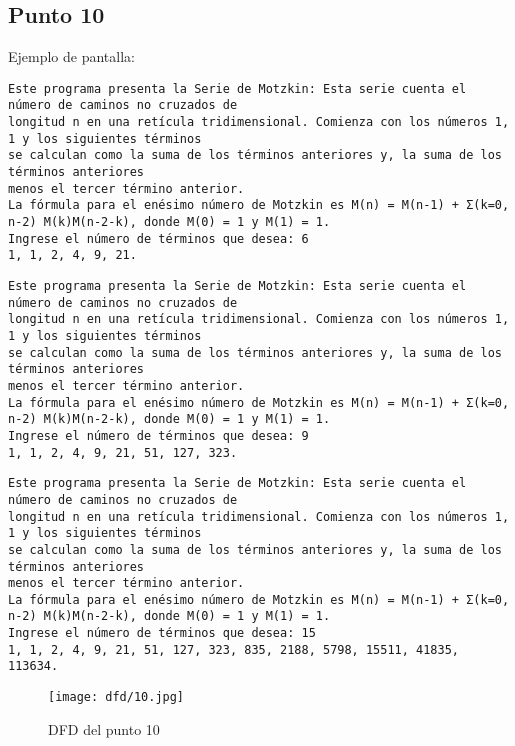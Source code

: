 


\subsection{Punto 10}
	
	Ejemplo de pantalla:
\begin{lstlisting}
Este programa presenta la Serie de Motzkin: Esta serie cuenta el número de caminos no cruzados de 
longitud n en una retícula tridimensional. Comienza con los números 1, 1 y los siguientes términos 
se calculan como la suma de los términos anteriores y, la suma de los términos anteriores 
menos el tercer término anterior. 
La fórmula para el enésimo número de Motzkin es M(n) = M(n-1) + Σ(k=0, n-2) M(k)M(n-2-k), donde M(0) = 1 y M(1) = 1.
Ingrese el número de términos que desea: 6
1, 1, 2, 4, 9, 21.
\end{lstlisting}

\begin{lstlisting}
Este programa presenta la Serie de Motzkin: Esta serie cuenta el número de caminos no cruzados de 
longitud n en una retícula tridimensional. Comienza con los números 1, 1 y los siguientes términos 
se calculan como la suma de los términos anteriores y, la suma de los términos anteriores 
menos el tercer término anterior. 
La fórmula para el enésimo número de Motzkin es M(n) = M(n-1) + Σ(k=0, n-2) M(k)M(n-2-k), donde M(0) = 1 y M(1) = 1.
Ingrese el número de términos que desea: 9
1, 1, 2, 4, 9, 21, 51, 127, 323.
\end{lstlisting}

\begin{lstlisting}
Este programa presenta la Serie de Motzkin: Esta serie cuenta el número de caminos no cruzados de 
longitud n en una retícula tridimensional. Comienza con los números 1, 1 y los siguientes términos 
se calculan como la suma de los términos anteriores y, la suma de los términos anteriores 
menos el tercer término anterior. 
La fórmula para el enésimo número de Motzkin es M(n) = M(n-1) + Σ(k=0, n-2) M(k)M(n-2-k), donde M(0) = 1 y M(1) = 1.
Ingrese el número de términos que desea: 15
1, 1, 2, 4, 9, 21, 51, 127, 323, 835, 2188, 5798, 15511, 41835, 113634.
\end{lstlisting}

\begin{figure}
    \centering
    \texttt{[image: dfd/10.jpg]}
    \caption{ DFD del punto 10}
    \label{fig: DFD del punto 10}
\end{figure}

